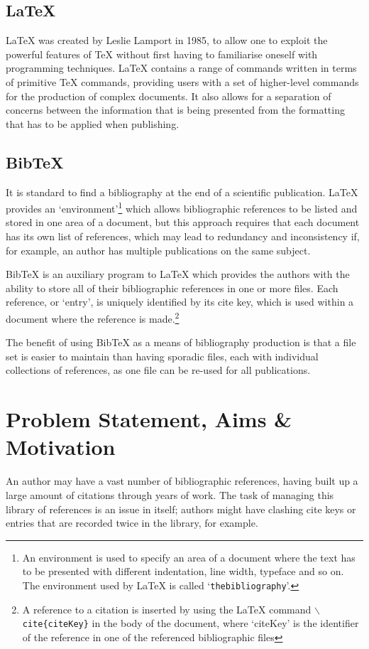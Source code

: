\documentclass{l4proj}
\newcommand{\BibTeX}{B{\sc ib}\TeX}
\newcommand{\bibtex}{\BibTeX}
\newcommand{\latex}{\LaTeX{} }
\begin{document}
\subsection{\LaTeX}
\latex was created by Leslie Lamport in 1985, to allow one to exploit the powerful features of \TeX{} without first having to familiarise oneself with programming techniques. \latex contains a range of commands written in terms of primitive \TeX{} commands, providing users with a set of higher-level commands for the production of complex documents.  It also allows for a separation of concerns between the information that is being presented from the formatting that has to be applied when publishing\cite{KD95}.

\subsection{\bibtex}
It is standard to find a bibliography at the end of a scientific publication. \latex provides an `environment'\footnote{An environment is used to specify an area of a document where the text has to be presented with different indentation, line width, typeface and so on\cite{KD95}.  The environment used by \latex is called `\texttt{thebibliography}'.} which allows bibliographic references to be listed and stored in one area of a document\cite{KD95}, but this approach requires that each document has its own list of references, which may lead to redundancy and inconsistency if, for example, an author has multiple publications on the same subject. 

\bibtex{} is an auxiliary program to \latex which provides the authors with the ability to store all of their bibliographic references in one or more files.  Each reference, or `entry', is uniquely identified by its cite key, which is used within a document where the reference is made.\footnote{A reference to a citation is inserted by using the \latex command \texttt{$\backslash$cite\{citeKey\}} in the body of the document, where `citeKey' is the identifier of the reference in one of the referenced bibliographic files}

The benefit of using \bibtex{} as a means of bibliography production is that a file set is easier to maintain than having sporadic files, each with individual collections of references, as one file can be re-used for all publications.

\section{Problem Statement, Aims \& Motivation}
An author may have a vast number of bibliographic references, having built up a large amount of citations through years of work.  The task of managing this library of references is an issue in itself; authors might have clashing cite keys or entries that are recorded twice in the library, for example.
\end{document}
